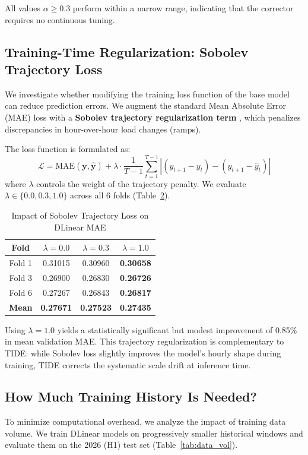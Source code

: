 \documentclass[journal]{IEEEtran}
\begin{document}
\begin{table}[t]
All values $\alpha \geq 0.3$ perform within a narrow range, indicating that the corrector requires no continuous tuning.

\subsection{Training-Time Regularization: Sobolev Trajectory Loss}
We investigate whether modifying the training loss function of the base model can reduce prediction errors. We augment the standard Mean Absolute Error (MAE) loss with a \textbf{Sobolev trajectory regularization term} \cite{sobolev1995}, which penalizes discrepancies in hour-over-hour load changes (ramps).

The loss function is formulated as:
\begin{equation}
\mathcal{L} = \text{MAE}(\mathbf{y}, \hat{\mathbf{y}}) + \lambda \cdot \frac{1}{T-1} \sum_{t=1}^{T-1} \left| (y_{t+1} - y_t) - (\hat{y}_{t+1} - \hat{y}_t) \right|
\end{equation}
where $\lambda$ controls the weight of the trajectory penalty. We evaluate $\lambda \in \{0.0, 0.3, 1.0\}$ across all 6 folds (Table~\ref{tab:sobolev}).

\begin{table}[htbp]
\caption{Impact of Sobolev Trajectory Loss on DLinear MAE}
\label{tab:sobolev}
\centering
\begin{tabular}{cccc}
\toprule
\textbf{Fold} & \textbf{$\lambda = 0.0$} & \textbf{$\lambda = 0.3$} & \textbf{$\lambda = 1.0$} \\
\midrule
Fold 1 & 0.31015 & 0.30960 & \textbf{0.30658} \\
Fold 3 & 0.26900 & 0.26830 & \textbf{0.26726} \\
Fold 6 & 0.27267 & 0.26843 & \textbf{0.26817} \\
\midrule
\textbf{Mean} & \textbf{0.27671} & \textbf{0.27523} & \textbf{0.27435} \\
\bottomrule
\end{tabular}
\end{table}

Using $\lambda = 1.0$ yields a statistically significant but modest improvement of 0.85\% in mean validation MAE. This trajectory regularization is complementary to TIDE: while Sobolev loss slightly improves the model's hourly shape during training, TIDE corrects the systematic scale drift at inference time.

\subsection{How Much Training History Is Needed?}
To minimize computational overhead, we analyze the impact of training data volume. We train DLinear models on progressively smaller historical windows and evaluate them on the 2026 (H1) test set (Table~\ref{tab:data_vol}).


\end{table}
\end{document}
